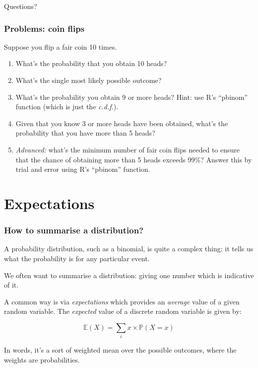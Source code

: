 \documentclass{beamer}
\begin{document}
	\begin{frame}
		\Large Questions?
	\end{frame}
	
	\begin{frame}
		\frametitle{Problems: coin flips}
		
		Suppose you flip a fair coin 10 times.
		
		\begin{enumerate}
			\item What's the probability that you obtain 10 heads?
			\item What's the single most likely possible outcome?
			\item What's the probability you obtain 9 or more heads? Hint: use R's ``pbinom'' function (which is just the \textit{c.d.f.}).
			\item Given that you know 3 or more heads have been obtained, what's the probability that you have more than 5 heads?
			\item \textit{Advanced:} what's the minimum number of fair coin flips needed to ensure that the chance of obtaining more than 5 heads exceeds 99\%? Answer this by trial and error using R's ``pbinom'' function.
		\end{enumerate}
		
	\end{frame}
	
	\section{Expectations}
	\frame{\tableofcontents[currentsection]}
	
	\begin{frame}
		\frametitle{How to summarise a distribution?}
		
		A probability distribution, such as a binomial, is quite a complex thing: it tells us what the probability is for any particular event.
		
		\vspace{0.5cm}
		
		We often want to summarise a distribution: giving one number which is indicative of it.
		
		\vspace{0.5cm}
		
		A common way is via \textit{expectations} which provides an \textit{average} value of a given random variable. The \textit{expected} value of a discrete random variable is given by:
		
		\begin{equation}
		\mathbb{E}(X) = \sum_{i} x \times \mathbb{P}(X=x)
		\end{equation}
		
		In words, it's a sort of weighted mean over the possible outcomes, where the weights are probabilities.
		
	\end{frame}
	
\end{document}
